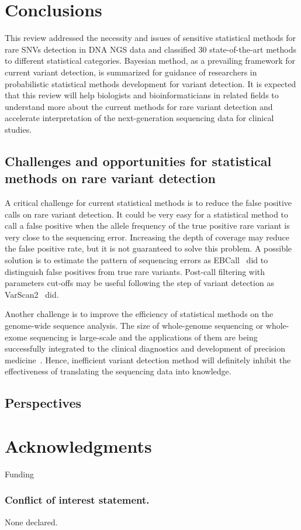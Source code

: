 \documentclass[a4,center,fleqn]{NAR}
\begin{document}
\section{Conclusions}

This review addressed the necessity and issues of sensitive statistical methods for rare SNVs detection in DNA NGS data and classified 30 state-of-the-art methods to different statistical categories.
Bayesian method, as a prevailing framework for current variant detection, is summarized for guidance of researchers in probabilistic statistical methods development for variant detection.
It is expected that this review will help biologists and bioinformaticians in related fields to understand more about the current methods for rare variant detection and accelerate interpretation of the next-generation sequencing data for clinical studies. 


\subsection{Challenges and opportunities for statistical methods on rare variant detection}

A critical challenge for current statistical methods is to reduce the false positive calls on rare variant detection.
It could be very easy for a statistical method to call a false positive when the allele frequency of the true positive rare variant is very close to the sequencing error.
Increasing the depth of coverage may reduce the false positive rate, but it is not guaranteed to solve this problem.
A possible solution is to estimate the pattern of sequencing errors as EBCall~\citep{Shiraishi2013} did to distinguish false positives from true rare variants.
Post-call filtering with parameters cut-offs may be useful following the step of variant detection as VarScan2~\citep{Koboldt2012} did.

Another challenge is to improve the efficiency of statistical methods on the genome-wide sequence analysis.
The size of whole-genome sequencing or whole-exome sequencing is large-scale and the applications of them are being successfully integrated to the clinical diagnostics and development of precision medicine~\citep{chiang2012exome, worthey2011making}.
Hence, inefficient variant detection method will definitely inhibit the effectiveness of translating the sequencing data into knowledge.



\subsection{Perspectives}




\section{Acknowledgments}
Funding




\subsubsection{Conflict of interest statement.} None declared.
\newpage



\end{document}
